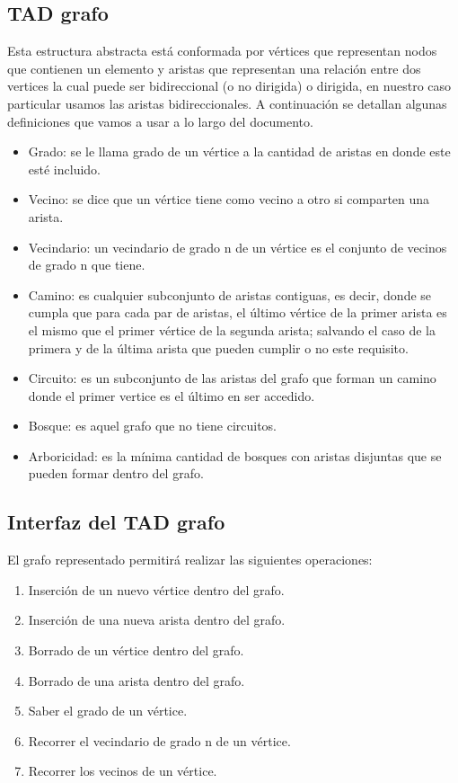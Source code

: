 \documentclass[a4paper,12pt]{article}
\begin{document}
\subsection{TAD grafo}
Esta estructura abstracta est\'a conformada por v\'ertices que representan nodos que contienen un elemento y aristas que representan una relaci\'on entre dos vertices la cual puede ser bidireccional (o no dirigida) o dirigida, en nuestro caso particular usamos las aristas bidireccionales. A continuaci\'on se detallan algunas definiciones que vamos a usar a lo largo del documento.
\begin{itemize}
\item Grado: se le llama grado de un v\'ertice a la cantidad de aristas en donde este est\'e incluido.
\item Vecino: se dice que un v\'ertice tiene como vecino a otro si comparten una arista.
\item Vecindario: un vecindario de grado n de un v\'ertice es el conjunto de vecinos de grado n que tiene.
\item Camino: es cualquier subconjunto de aristas contiguas, es decir, donde se cumpla que para cada par de aristas, el \'ultimo v\'ertice de la primer arista es el mismo que el primer v\'ertice de la segunda arista; salvando el caso de la primera y de la \'ultima arista que pueden cumplir o no este requisito.
\item Circuito: es un subconjunto de las aristas del grafo que forman un camino donde el primer vertice es el \'ultimo en ser accedido.
\item Bosque: es aquel grafo que no tiene circuitos.
\item Arboricidad: es la m\'inima cantidad de bosques con aristas disjuntas que se pueden formar dentro del grafo.
\end{itemize}

\subsection{Interfaz del TAD grafo}

El grafo representado permitir\'a realizar las siguientes operaciones:
\begin{enumerate}
\item Inserci\'on de un nuevo v\'ertice dentro del grafo.
\item Inserci\'on de una nueva arista dentro del grafo.
\item Borrado de un v\'ertice dentro del grafo.
\item Borrado de una arista dentro del grafo.
\item Saber el grado de un v\'ertice.
\item Recorrer el vecindario de grado n de un v\'ertice.
\item Recorrer los vecinos de un v\'ertice.
\end{enumerate}
\end{document}

